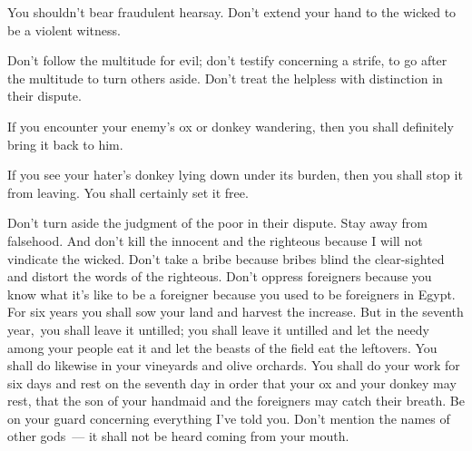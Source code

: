 
\begin{inparaenum}
     You shouldn't bear fraudulent hearsay. Don't extend your hand to the wicked to be a violent witness.%
    
     Don't follow the multitude for evil; don't testify concerning a strife, to go after the multitude to turn others aside.%
     Don't treat the helpless with distinction in their dispute.%
    
     If you encounter your enemy's ox or donkey wandering, then you shall definitely bring it back to him.%
    
     If you see your hater's donkey lying down under its burden, then you shall stop it from leaving. You shall certainly set it free.%
    
     Don't turn aside the judgment of the poor in their dispute.%
     Stay away from falsehood. And don't kill the innocent and the righteous because I will not vindicate the wicked.%
     Don't take a bribe because bribes blind the clear-sighted and distort the words of the righteous.%
     Don't oppress foreigners because you know what it's like to be a foreigner because you used to be foreigners in Egypt.%
     For six years you shall sow your land and harvest the increase.%
     But in the seventh year,\understood\ you shall leave it untilled; you shall leave it untilled and let the needy among your people eat it and let the beasts of the field eat the leftovers. You shall do likewise in your vineyards and olive orchards.%
     You shall do your work for six days and rest on the seventh day in order that your ox and your donkey may rest, that the son of your handmaid and the foreigners may catch their breath.%
     Be on your guard concerning everything I've told you. Don't mention the names of other gods~--- it shall not be heard coming from your mouth.%
    

\end{inparaenum}
